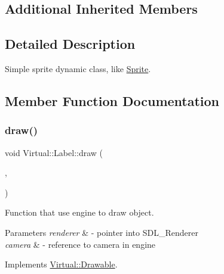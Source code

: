 \subsection*{Additional Inherited Members}


\subsection{Detailed Description}
Simple sprite dynamic class, like \hyperlink{class_virtual_1_1_sprite}{Sprite}. 

\subsection{Member Function Documentation}
\hypertarget{class_virtual_1_1_label_a077d7852f09f940a9932f63fb616351c}{}\label{class_virtual_1_1_label_a077d7852f09f940a9932f63fb616351c} 
\subsubsection{\texorpdfstring{draw()}{draw()}}
{\footnotesize\ttfamily void Virtual\+::\+Label\+::draw (\begin{DoxyParamCaption}\item[{S\+D\+L\+\_\+\+Renderer $\ast$}]{,  }\item[{\hyperlink{class_virtual_1_1_camera}{Camera} \&}]{ }\end{DoxyParamCaption})\hspace{0.3cm}{\ttfamily [virtual]}}



Function that use engine to draw object. 


\begin{DoxyParams}{Parameters}
{\em renderer} & -\/ pointer into S\+D\+L\+\_\+\+Renderer \\
\hline
{\em camera} & -\/ reference to camera in engine \\
\hline
\end{DoxyParams}


Implements \hyperlink{class_virtual_1_1_drawable_af7014800911efa59b96e538149e56f8b}{Virtual\+::\+Drawable}.

\hypertarget{class_virtual_1_1_label_adf4f738abab5dca3815a9c6f4124eec6}{}\label{class_virtual_1_1_label_adf4f738abab5dca3815a9c6f4124eec6} 
